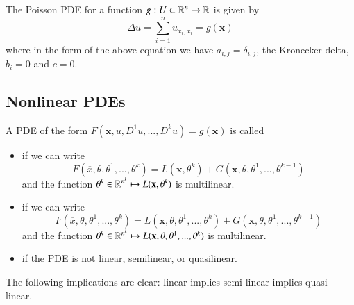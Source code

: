 \documentclass[12pt, a4paper, oneside, openright, titlepage]{book}
\begin{document}
\begin{eg}
    The Poisson PDE for a function $g:U\subset\mathbb R^n\rightarrow \mathbb R$ is given by \begin{equation*}
        \Delta u = \sum_{i=1}^nu_{x_i,x_i} = g(\mathbf{x})
    \end{equation*}
    where in the form of the above equation we have $a_{i,j} = \delta_{i,j}$, the Kronecker delta, $b_i = 0$ and $c = 0$.
\end{eg}

\subsection{Nonlinear PDEs}

\begin{defn}
    A PDE of the form $F(\mathbf{x},u,D^1u,...,D^ku) = g(\mathbf{x})$ is called \begin{itemize}
        \item {} if we can write \begin{equation*}
                F(\overline{x},\theta,\theta^1,...,\theta^k) = L(\mathbf{x},\theta^k) + G(\mathbf{x},\theta,\theta^1,...,\theta^{k-1})
        \end{equation*}
            and the function $\theta^k \in \mathbb R^{n^k}\mapsto L(\mathbf{x},\theta^k)$ is multilinear.
        \item {} if we can write \begin{equation*}
                F(\overline{x},\theta,\theta^1,...,\theta^k) = L(\mathbf{x},\theta,\theta^1,...,\theta^k) + G(\mathbf{x},\theta,\theta^1,...,\theta^{k-1})
        \end{equation*}
            and the function $\theta^k \in \mathbb R^{n^k}\mapsto L(\mathbf{x},\theta,\theta^1,...,\theta^k)$ is multilinear.
        \item {} if the PDE is not linear, semilinear, or quasilinear.
    \end{itemize}
\end{defn}

The following implications are clear: linear implies semi-linear implies quasi-linear.
\end{document}
